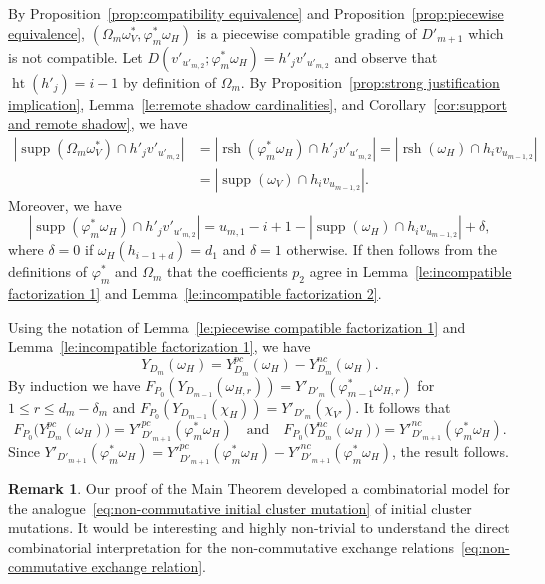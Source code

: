 \documentclass[10pt]{amsart}
\theoremstyle{definition}
\newtheorem{remark}[theorem]{Remark}
\DeclareMathOperator{\hgt}{ht}
\DeclareMathOperator{\supp}{supp}
\DeclareMathOperator{\rsh}{rsh}
\begin{document}
\begin{enumerate}[label=(\alph*)]
 By Proposition~\ref{prop:compatibility equivalence} and Proposition~\ref{prop:piecewise equivalence}, $(\Omega_m\omega^*_V,\varphi^*_m\omega_H)$ is a piecewise compatible grading of $D'_{m+1}$ which is not compatible.
 Let $D(v'_{u'_{m,2}};\varphi^*_m\omega_H)=h'_jv'_{u'_{m,2}}$ and observe that $\hgt(h'_j)=i-1$ by definition of $\Omega_m$.
 By Proposition~\ref{prop:strong justification implication}, Lemma~\ref{le:remote shadow cardinalities}, and Corollary~\ref{cor:support and remote shadow}, we have
 \begin{align*}
 |\supp(\Omega_m\omega^*_V)\cap h'_jv'_{u'_{m,2}}|&=|\rsh(\varphi^*_m\omega_H)\cap h'_jv'_{u'_{m,2}}|=|\rsh(\omega_H)\cap h_iv_{u_{m-1,2}}|\\
 &=|\supp(\omega_V)\cap h_iv_{u_{m-1,2}}|.
 \end{align*}
 Moreover, we have
 \[|\supp(\varphi^*_m\omega_H)\cap h'_jv'_{u'_{m,2}}|=u_{m,1}-i+1-|\supp(\omega_H)\cap h_iv_{u_{m-1,2}}|+\delta,\]
 where $\delta=0$ if $\omega_H(h_{i-1+d})=d_1$ and $\delta=1$ otherwise.
 If then follows from the definitions of $\varphi^*_m$ and $\Omega_m$ that the coefficients $p_2$ agree in Lemma~\ref{le:incompatible factorization 1} and Lemma~\ref{le:incompatible factorization 2}.

 Using the notation of Lemma~\ref{le:piecewise compatible factorization 1} and Lemma~\ref{le:incompatible factorization 1}, we have 
 \[
 Y_{D_m}(\omega_H)=Y_{D_m}^{pc}(\omega_H)-Y_{D_m}^{nc}(\omega_H).
 \]
 By induction we have $F_{P_0}(Y_{D_{m-1}}(\omega_{H,r}))=Y'_{D'_m}(\varphi^*_{m-1}\omega_{H,r})$ for $1\le r\le d_m-\delta_m$ and $F_{P_0}(Y_{D_{m-1}}(\chi_H))=Y'_{D'_m}(\chi_{V'})$.
 It follows that 
 \[
 F_{P_0}\big(Y_{D_m}^{pc}(\omega_H)\big)={Y'}_{D'_{m+1}}^{pc}(\varphi^*_m\omega_H) 
 \quad\text{and} \quad F_{P_0}\big(Y_{D_m}^{nc}(\omega_H)\big)={Y'}_{D'_{m+1}}^{nc}(\varphi^*_m\omega_H).
 \]
 Since $Y'_{D'_{m+1}}(\varphi^*_m\omega_H)={Y'}_{D'_{m+1}}^{pc}(\varphi^*_m\omega_H)-{Y'}_{D'_{m+1}}^{nc}(\varphi^*_m\omega_H)$, the result follows.
\end{enumerate}

\begin{remark}
 Our proof of the Main Theorem developed a combinatorial model for the analogue~\eqref{eq:non-commutative initial cluster mutation} of initial cluster mutations.
 It would be interesting and highly non-trivial to understand the direct combinatorial interpretation for the non-commutative exchange relations~\eqref{eq:non-commutative exchange relation}.
\end{remark}
\end{document}

